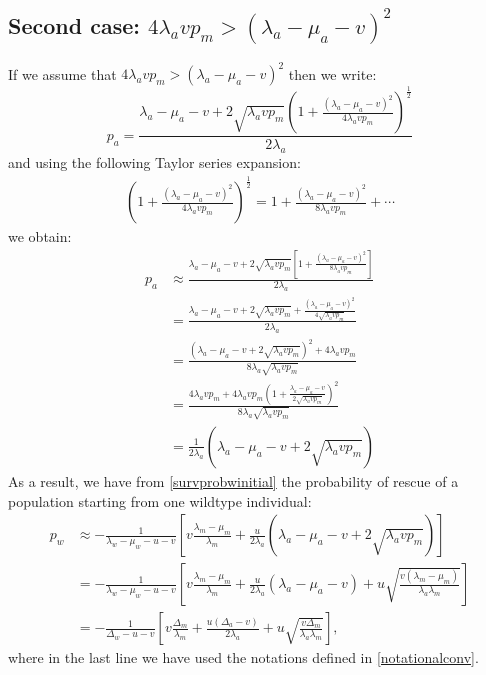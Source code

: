 \documentclass[12pt]{extarticle}
\begin{document}
\subsection*{Second case: $4\lambda_avp_m>\left(\lambda_a-\mu_a-v\right)^2$}
If we assume that  $4\lambda_avp_m>\left(\lambda_a-\mu_a-v\right)^2$ then we write:
\begin{equation}
p_a=\frac{\lambda_a-\mu_a-v+2\sqrt{\lambda_a vp_m}\left(1+\frac{\left(\lambda_a-\mu_a-v\right)^2}{4\lambda_avp_m}\right)^{\frac12}}{2\lambda_a}
\end{equation}
and using the following Taylor series expansion:
\begin{align*}
\left(1+\frac{\left(\lambda_a-\mu_a-v\right)^2}{4\lambda_avp_m}\right)^{\frac{1}{2}}=1+\frac{\left(\lambda_a-\mu_a-v\right)^2}{8\lambda_avp_m}+\cdots
\end{align*}
we obtain:
\begin{align*}
p_a&\approx\frac{\lambda_a-\mu_a-v+2\sqrt{\lambda_a vp_m}\left[1+\frac{\left(\lambda_a-\mu_a-v\right)^2}{8\lambda_avp_m}\right]}{2\lambda_a}\\
&=\frac{\lambda_a-\mu_a-v+2\sqrt{\lambda_a vp_m}+\frac{\left(\lambda_a-\mu_a-v\right)^2}{4\sqrt{\lambda_avp_m}}}{2\lambda_a}\\
&=\frac{\left(\lambda_a-\mu_a-v+2\sqrt{\lambda_avp_m}\right)^2+4\lambda_avp_m}{8\lambda_a\sqrt{\lambda_avp_m}}\\
&=\frac{4\lambda_avp_m+4\lambda_avp_m\left(1+\frac{\lambda_a-\mu_a-v}{2\sqrt{\lambda_avp_m}}\right)^2}{8\lambda_a\sqrt{\lambda_avp_m}}\\
&=\frac{1}{2\lambda_a}\left(\lambda_a-\mu_a-v+2\sqrt{\lambda_avp_m}\right)
\end{align*}
As a result, we have from \eqref{survprobwinitial} the probability of rescue of a population starting from one wildtype individual:
\begin{align*}
p_w&\approx-\frac{1}{\lambda_w-\mu_w-u-v}\left[v\frac{\lambda_m-\mu_m}{\lambda_m}+\frac{u}{2\lambda_a}\left(\lambda_a-\mu_a-v+2\sqrt{\lambda_avp_m}\right)\right]\\
&=-\frac{1}{\lambda_w-\mu_w-u-v}\left[v\frac{\lambda_m-\mu_m}{\lambda_m}+\frac{u}{2\lambda_a}\left(\lambda_a-\mu_a-v\right)+u\sqrt{\frac{v\left(\lambda_m-\mu_m\right)}{\lambda_a\lambda_m}}\right]\\
&=-\frac{1}{\Delta_w-u-v}\left[v\frac{\Delta_m}{\lambda_m}+\frac{u\left(\Delta_a-v\right)}{2\lambda_a}+u\sqrt{\frac{v\Delta_m}{\lambda_a\lambda_m}}\right],
\end{align*}
where in the last line we have used the notations defined in \eqref{notationalconv}.
\end{document}
